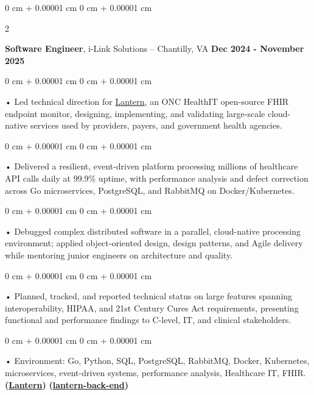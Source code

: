 \documentclass[10pt, letterpaper]{article}
\newenvironment{onecolentry}{
    \begin{adjustwidth}{
        0 cm + 0.00001 cm
    }{
        0 cm + 0.00001 cm
    }
}{
    \end{adjustwidth}
} %
\newenvironment{twocolentry}[2][]{
    \onecolentry
    \def\secondColumn{#2}
    \setcolumnwidth{\fill, 4.5 cm}
    \begin{paracol}{2}
}{
    \switchcolumn \raggedleft \secondColumn
    \end{paracol}
    \endonecolentry
} %
\begin{document}
        \vspace{0.1cm}

        \begin{twocolentry}{
            \textbf{Dec 2024 - November 2025}
        }
            \textbf{Software Engineer}, i-Link Solutions -- Chantilly, VA\end{twocolentry}


        \begin{onecolentry}
             • Led technical direction for \href{https://lantern.healthit.gov/?tab=dashboard_tab}{Lantern}, an ONC HealthIT open-source FHIR endpoint monitor, designing, implementing, and validating large-scale cloud-native services used by providers, payers, and government health agencies.
        \end{onecolentry}
        \begin{onecolentry}
             • Delivered a resilient, event-driven platform processing millions of healthcare API calls daily at 99.9\% uptime, with performance analysis and defect correction across Go microservices, PostgreSQL, and RabbitMQ on Docker/Kubernetes.
        \end{onecolentry}
        \begin{onecolentry}
             • Debugged complex distributed software in a parallel, cloud-native processing environment; applied object-oriented design, design patterns, and Agile delivery while mentoring junior engineers on architecture and quality.
        \end{onecolentry}
        \begin{onecolentry}
             • Planned, tracked, and reported technical status on large features spanning interoperability, HIPAA, and 21st Century Cures Act requirements, presenting functional and performance findings to C-level, IT, and clinical stakeholders.
        \end{onecolentry}

        \begin{onecolentry}
             • Environment: Go, Python, SQL, PostgreSQL, RabbitMQ, Docker, Kubernetes, microservices, event-driven systems, performance analysis, Healthcare IT, FHIR. \textbf{(\href{https://lantern.healthit.gov/?tab=dashboard_tab}{Lantern})} \textbf{(\href{https://github.com/onc-healthit/lantern-back-end}{lantern-back-end})}
        \end{onecolentry}
        \vspace{0.1cm}
\end{document}
